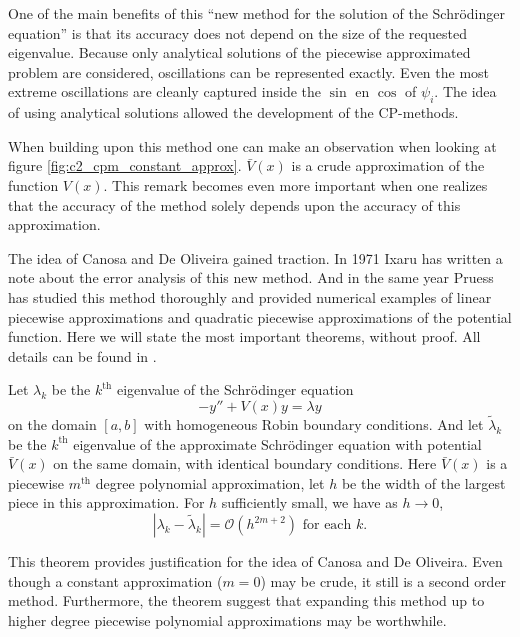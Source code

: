One of the main benefits of this ``new method for the solution of the Schrödinger equation'' is that its accuracy does not depend on the size of the requested eigenvalue. Because only analytical solutions of the piecewise approximated problem are considered, oscillations can be represented exactly. Even the most extreme oscillations are cleanly captured inside the $\sin$ en $\cos$ of $\psi_i$. The idea of using analytical solutions allowed the development of the CP-methods.

When building upon this method one can make an observation when looking at figure \ref{fig:c2_cpm_constant_approx}. $\bar{V}(x)$ is a crude approximation of the function $V(x)$. This remark becomes even more important when one realizes that the accuracy of the method solely depends upon the accuracy of this approximation.

The idea of Canosa and De Oliveira gained traction. In 1971 Ixaru \cite{ixaru_error_1972} has written a note about the error analysis of this new method. And in the same year Pruess \cite{pruess_estimating_1973} has studied this method thoroughly and provided numerical examples of linear piecewise approximations and quadratic piecewise approximations of the potential function. Here we will state the most important theorems, without proof. All details can be found in \cite{pruess_estimating_1973}.

\begin{theorem}[Pruess 1973]\label{the:c2_pruess_1973_1}
    Let $\lambda_k$ be the $k^\text{th}$ eigenvalue of the Schrödinger equation
    $$
        -y'' + V(x) y = \lambda y
    $$
    on the domain $[a, b]$ with homogeneous Robin boundary conditions. And let $\tilde{\lambda}_k$ be the $k^\text{th}$ eigenvalue of the approximate Schrödinger equation with potential $\bar{V}(x)$ on the same domain, with identical boundary conditions. Here $\bar{V}(x)$ is a piecewise $m^\text{th}$ degree polynomial approximation, let $h$ be the width of the largest piece in this approximation. For $h$ sufficiently small, we have as $h \to 0$,
    $$
        |\lambda_k - \tilde{\lambda}_k| = \mathcal{O}(h^{2m + 2}) \text{ for each $k$.}
    $$
\end{theorem}

This theorem provides justification for the idea of Canosa and De Oliveira. Even though a constant approximation ($m = 0$) may be crude, it still is a second order method. Furthermore, the theorem suggest that expanding this method up to higher degree piecewise polynomial approximations may be worthwhile.

